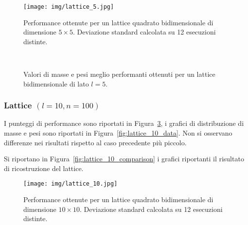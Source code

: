 \documentclass[10pt,a4paper]{article}
\begin{document}
\begin{figure}[p]
    \centering
    \texttt{[image: img/lattice\_5.jpg]}
    \caption{Performance ottenute per un lattice quadrato bidimensionale di dimensione \(5 \times 5\). Deviazione standard calcolata su 12 esecuzioni distinte.}\label{fig:lattice_5_performance}
\end{figure}

\begin{figure}[p]
    \centering
    \\
    \caption{Valori di masse e pesi meglio performanti ottenuti per un lattice bidimensionale di lato \(l=5\).}\label{fig:lattice_5_data}
\end{figure}

\subsubsection{Lattice \((l = 10, n = 100)\)}

I punteggi di performance sono riportati in Figura~\ref{fig:lattice_10_performance}, i grafici di distribuzione di masse e pesi sono riportati in Figura~\ref{fig:lattice_10_data}.
Non si osservano differenze nei risultati rispetto al caso precedente più piccolo.

Si riportano in Figura~\ref{fig:lattice_10_comparison} i grafici riportanti il risultato di ricostruzione del lattice.

\begin{figure}[p]
    \centering
    \texttt{[image: img/lattice\_10.jpg]}
    \caption{Performance ottenute per un lattice quadrato bidimensionale di dimensione \(10 \times 10\). Deviazione standard calcolata su 12 esecuzioni distinte.}\label{fig:lattice_10_performance}
\end{figure}
\end{document}
